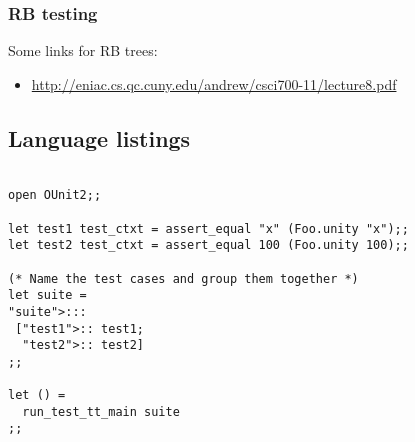\documentclass{article}
\begin{document}
\subsubsection{RB testing}

Some links for RB trees:

\begin{itemize}
\item \href{http://eniac.cs.qc.cuny.edu/andrew/csci700-11/lecture8.pdf}{%
http://eniac.cs.qc.cuny.edu/andrew/csci700-11/lecture8.pdf}
\end{itemize}

\subsection{Language listings}

\begin{lstlisting}[frame=single]  % Start your code-block

open OUnit2;;

let test1 test_ctxt = assert_equal "x" (Foo.unity "x");;
let test2 test_ctxt = assert_equal 100 (Foo.unity 100);;

(* Name the test cases and group them together *)
let suite =
"suite">:::
 ["test1">:: test1;
  "test2">:: test2]
;;

let () =
  run_test_tt_main suite
;;
\end{lstlisting}
\end{document}
